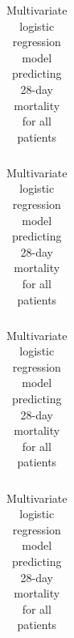 \documentclass[final,10pt]{elsarticle}
\begin{document}
%

%

\begin{table}[h]
\begin{tabular}{l c c}
\toprule

\bottomrule
\end{tabular}
\caption{Multivariate logistic regression model predicting 28-day mortality for all patients}
\label{tbl:all-comorb}
\end{table}

\begin{table}[h]
\begin{tabular}{l c c}
\toprule

\bottomrule
\end{tabular}
\caption{Multivariate logistic regression model predicting 28-day mortality for all patients}
\label{tbl:all-comorb}
\end{table}

\begin{table}[h]
\begin{tabular}{l c c}
\toprule

\bottomrule
\end{tabular}
\caption{Multivariate logistic regression model predicting 28-day mortality for all patients}
\label{tbl:all-comorb}
\end{table}

\begin{table}[h]
\begin{tabular}{l c c}
\toprule

\bottomrule
\end{tabular}
\caption{Multivariate logistic regression model predicting 28-day mortality for all patients}
\label{tbl:all-comorb}
\end{table}
\end{document}
